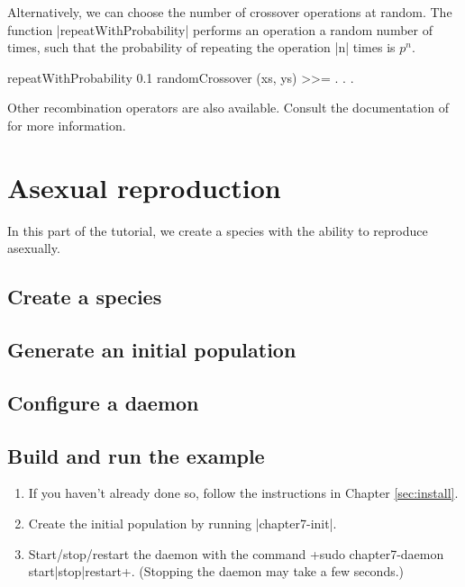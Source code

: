 \documentclass[a4paper,10pt]{report}
\begin{document}
Alternatively, we can choose the number of crossover operations at 
random. The function |repeatWithProbability| performs an operation a
random number of times, such that the probability of repeating the
operation |n| times is $p^n$.

\begin{code}
    repeatWithProbability 0.1 randomCrossover (xs, ys) >>=
    . . .
\end{code} 

Other recombination operators are also available.
Consult the documentation of 
for more information.

\chapter{Asexual reproduction}
\label{sec:plant}

In this part of the tutorial, we create a species with the
ability to reproduce asexually.

\section{Create a species}
\label{sec:species2}



\section{Generate an initial population}
\label{sec:pop2}



\section{Configure a daemon}
\label{sec:daemon2}



\section{Build and run the example}
\label{sec:run2}

\begin{enumerate}
\item If you haven't already done so, follow the instructions in Chapter 
\ref{sec:install}.
\item Create the initial population by running |chapter7-init|.
\item Start/stop/restart the daemon with the command
\UndefineShortVerb{\|}
\DefineShortVerb{\+}
+sudo chapter7-daemon start|stop|restart+.
\UndefineShortVerb{\+}
\DefineShortVerb{\|}
(Stopping the daemon may take a few seconds.)
\end{enumerate}
\end{document}
